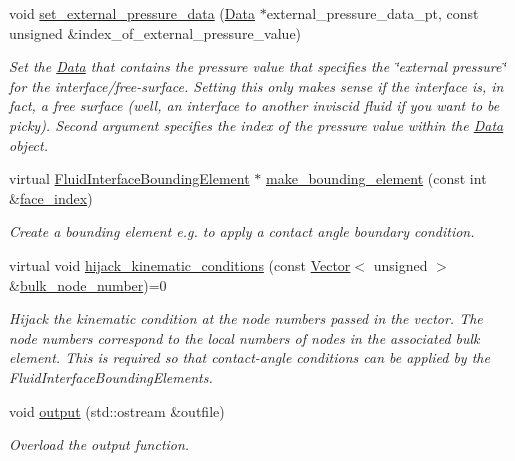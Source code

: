 \begin{DoxyCompactItemize}
void \hyperlink{classoomph_1_1FluidInterfaceElement_a87ee1f3227c456a4c30df77c4d0bad6b}{set\+\_\+external\+\_\+pressure\+\_\+data} (\hyperlink{classoomph_1_1Data}{Data} $\ast$external\+\_\+pressure\+\_\+data\+\_\+pt, const unsigned \&index\+\_\+of\+\_\+external\+\_\+pressure\+\_\+value)
\begin{DoxyCompactList}\small\item\em Set the \hyperlink{classoomph_1_1Data}{Data} that contains the pressure value that specifies the \char`\"{}external pressure\char`\"{} for the interface/free-\/surface. Setting this only makes sense if the interface is, in fact, a free surface (well, an interface to another inviscid fluid if you want to be picky). Second argument specifies the index of the pressure value within the \hyperlink{classoomph_1_1Data}{Data} object. \end{DoxyCompactList}\item 
virtual \hyperlink{classoomph_1_1FluidInterfaceBoundingElement}{Fluid\+Interface\+Bounding\+Element} $\ast$ \hyperlink{classoomph_1_1FluidInterfaceElement_a376f8d1d451890b5725c7a991c34b6fc}{make\+\_\+bounding\+\_\+element} (const int \&\hyperlink{classoomph_1_1FaceElement_a478d577ac6db67ecc80f1f02ae3ab170}{face\+\_\+index})
\begin{DoxyCompactList}\small\item\em Create a bounding element e.\+g. to apply a contact angle boundary condition. \end{DoxyCompactList}\item 
virtual void \hyperlink{classoomph_1_1FluidInterfaceElement_a7eb949642baee233779e4f92478ea341}{hijack\+\_\+kinematic\+\_\+conditions} (const \hyperlink{classoomph_1_1Vector}{Vector}$<$ unsigned $>$ \&\hyperlink{classoomph_1_1FaceElement_ae437e62de81be4c4183de872d1119b16}{bulk\+\_\+node\+\_\+number})=0
\begin{DoxyCompactList}\small\item\em Hijack the kinematic condition at the node numbers passed in the vector. The node numbers correspond to the local numbers of nodes in the associated bulk element. This is required so that contact-\/angle conditions can be applied by the Fluid\+Interface\+Bounding\+Elements. \end{DoxyCompactList}\item 
void \hyperlink{classoomph_1_1FluidInterfaceElement_aba83fbd0679ffca4ef6aa32f7aa5d179}{output} (std\+::ostream \&outfile)
\begin{DoxyCompactList}\small\item\em Overload the output function. \end{DoxyCompactList}\item 

\end{DoxyCompactItemize}
